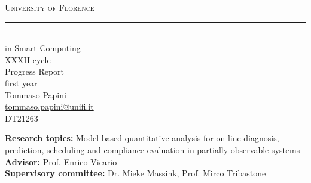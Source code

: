 
\begin{titlepage}
  \begin{center}
    {\scshape
      {\huge University of Florence}\\
      \rule{0.9\textwidth}{1.5pt}\\[0.5cm]
      {\Large {} in Smart Computing}\\
      {\large XXXII cycle}\\[3cm]
      {\huge Progress Report}\\
      {\large first year}\\[3cm]
      {\Large Tommaso Papini}\\
      {\upshape \href{mailto:tommaso.papini@unifi.it}{tommaso.papini@unifi.it}}\\
      DT21263
    }
  \end{center}
  
  \vfill
  
  \noindent
  \textbf{Research topics:} Model-based quantitative analysis for on-line diagnosis, prediction, scheduling and compliance evaluation in partially observable systems\\
  \textbf{Advisor:} Prof. Enrico Vicario\\
  \textbf{Supervisory committee:} Dr. Mieke Massink, Prof. Mirco Tribastone
\end{titlepage}
